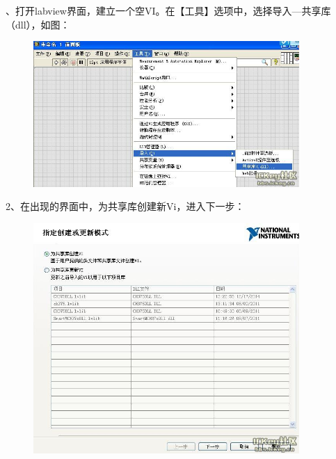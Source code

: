 、打开labview界面，建立一个空VI。在【工具】选项中，选择导入—共享库（dll），如图：
\begin{figure}[htbp]
\centering
\includegraphics[width=0.9\textwidth]{pictures/1.jpg}
\end{figure}

2、在出现的界面中，为共享库创建新Vi，进入下一步：
\begin{figure}[h!]
\centering
\includegraphics[width=0.9\textwidth]{pictures/2.jpg}
\end{figure}

